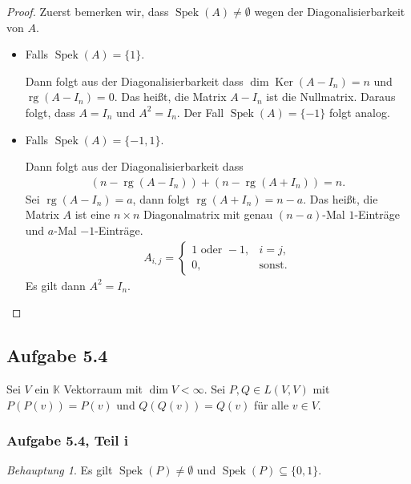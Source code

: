\documentclass[draft,a5paper]{article}
\theoremstyle{remark}
\newtheorem*{beh}{Behauptung}
\DeclareMathOperator{\Spek}{Spek}
\DeclareMathOperator{\Ker}{Ker}
\DeclareMathOperator{\rg}{rg}
\begin{document}
\begin{proof}
  Zuerst bemerken wir, dass \(\Spek(A) \ne \emptyset\) wegen der
  Diagonalisierbarkeit von \(A\).
  \begin{itemize}
  \item Falls \(\Spek(A) = \{1\}\).

    Dann folgt aus der Diagonalisierbarkeit dass
    \(\dim \Ker (A - I_{n}) = n\) und \(\rg(A-I_{n}) = 0\).  Das
    heißt, die Matrix \(A - I_{n}\) ist die Nullmatrix.  Daraus folgt,
    dass \(A = I_{n}\) und \(A^{2} = I_{n}\).  Der Fall
    \(\Spek(A) = \{-1\}\) folgt analog.

  \item Falls \(\Spek(A) = \{-1, 1\}\).

    Dann folgt aus der Diagonalisierbarkeit dass
    \begin{align*}
      (n - \rg(A - I_{n})) + (n - \rg(A + I_{n})) = n.
    \end{align*}
    Sei \(\rg(A - I_{n}) = a\), dann folgt \(\rg(A + I_{n}) = n - a\).
    Das heißt, die Matrix \(A\) ist eine \(n \times n\) Diagonalmatrix mit
    genau \((n-a)\)-Mal \(1\)-Einträge und \(a\)-Mal \(-1\)-Einträge.
    \begin{align*}
      A_{i,j} =
      \begin{cases}
        1 \text{ oder } -1, & i = j, \\
        0, & \text{sonst.}
      \end{cases}
    \end{align*}
    Es gilt dann \(A^{2} = I_{n}\).
  \end{itemize}
\end{proof}

\subsection*{Aufgabe 5.4}

Sei \(V\) ein \(\mathbb{K}\) Vektorraum mit \(\dim V < \infty\).  Sei
\(P, Q \in L(V, V)\) mit \(P(P(v)) = P(v)\) und \(Q(Q(v)) = Q(v)\) für
alle \(v \in V\).

\subsubsection*{Aufgabe 5.4, Teil i}

\begin{beh}
  Es gilt \(\Spek(P) \ne \emptyset\) und \(\Spek(P) \subseteq \{0, 1\}\).
\end{beh}
\end{document}
